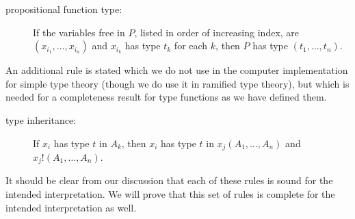 \documentclass{article}
\begin{document}
\begin{description}

\item[propositional function type:] If the variables free in $P$,
listed in order of increasing index, are $(x_{i_1},\ldots,x_{i_n})$ and
$x_{i_k}$ has type $t_k$ for each $k$, then $P$ has type
$(t_1,\ldots,t_n)$.

\end{description}

An additional rule is stated which we do not use in the computer
implementation for simple type theory (though we do use it in ramified
type theory), but which is needed for a completeness result for type
functions as we have defined them.

\begin{description}

\item[type inheritance:] If $x_i$ has type $t$ in $A_k$, then
$x_i$ has type $t$ in $x_j(A_1,\ldots,A_n)$ and
$x_j!(A_1,\ldots,A_n)$.

\end{description}

It should be clear from our discussion that each of these rules is
sound for the intended interpretation.  We will prove that this set of
rules is complete for the intended interpretation as well.
\end{document}

